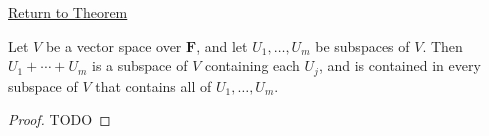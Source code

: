 \newpage
{}
\label{prf:sum-of-subspaces-smallest-containing}

\begin{remark*}[Return]
\hyperref[thm:sum-of-subspaces-smallest-containing]{Return to Theorem}
\end{remark*}

\begin{theorem*}
Let $V$ be a vector space over $\mathbf{F}$, and let $U_1,\dots,U_m$
be subspaces of $V$. Then $U_1+\cdots+U_m$ is a subspace of $V$
containing each $U_j$, and is contained in every subspace of $V$
that contains all of $U_1,\dots,U_m$.
\end{theorem*}

\begin{proof}
TODO
\end{proof}

